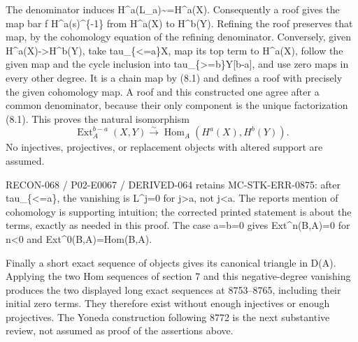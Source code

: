 The denominator induces H\textasciicircum{}a(L\_\allowbreak{}a)\allowbreak{}\textasciitilde{}\allowbreak{}=H\textasciicircum{}a(X)\allowbreak{}. Consequently a roof gives the map bar f H\textasciicircum{}a(s)\allowbreak{}\textasciicircum{}\{-1\} from H\textasciicircum{}a(X)\allowbreak{} to H\textasciicircum{}b(Y)\allowbreak{}. Refining the roof preserves that map,\allowbreak{} by the cohomology equation of the refining denominator. Conversely,\allowbreak{} given H\textasciicircum{}a(X)\allowbreak{}\allowbreak{}->H\textasciicircum{}b(Y)\allowbreak{},\allowbreak{} take tau\_\allowbreak{}\{<\allowbreak{}=a\}X,\allowbreak{} map its top term to H\textasciicircum{}a(X)\allowbreak{},\allowbreak{} follow the given map and the cycle inclusion into tau\_\allowbreak{}\{>\allowbreak{}=b\}Y[b-a]\allowbreak{},\allowbreak{} and use zero maps in every other degree. It is a chain map by (8.1)\allowbreak{} and defines a roof with precisely the given cohomology map. A roof and this constructed one agree after a common denominator,\allowbreak{} because their only component is the unique factorization (8.1)\allowbreak{}. This proves the natural isomorphism \[
 \operatorname{Ext}^{b-a}_A(X,Y)
   \xrightarrow{\sim}
 \operatorname{Hom}_A(H^a(X),H^b(Y)).                         \tag{8.2}
\] No injectives,\allowbreak{} projectives,\allowbreak{} or replacement objects with altered support are assumed.

RECON-068 /\allowbreak{} P02-E0067 /\allowbreak{} DERIVED-064 retains MC-STK-ERR-0875:\allowbreak{} after tau\_\allowbreak{}\{<\allowbreak{}=a\},\allowbreak{} the vanishing is L\textasciicircum{}j\allowbreak{}=0 for j>a,\allowbreak{} not j\textless a. The report\textquotesingle s mention of cohomology is supporting intuition; the corrected printed statement is about the terms,\allowbreak{} exactly as needed in this proof. The case a\allowbreak{}=b\allowbreak{}=0 gives Ext\textasciicircum{}n(B,\allowbreak{}A)\allowbreak{}\allowbreak{}=0 for n\textless0 and Ext\textasciicircum{}0(B,\allowbreak{}A)\allowbreak{}\allowbreak{}=Hom(B,\allowbreak{}A)\allowbreak{}.

Finally a short exact sequence of objects gives its canonical triangle in D(A)\allowbreak{}. Applying the two Hom sequences of section 7 and this negative-degree vanishing produces the two displayed long exact sequences at 8753–\allowbreak{}8765,\allowbreak{} including their initial zero terms. They therefore exist without enough injectives or enough projectives. The Yoneda construction following 8772 is the next substantive review,\allowbreak{} not assumed as proof of the assertions above.

